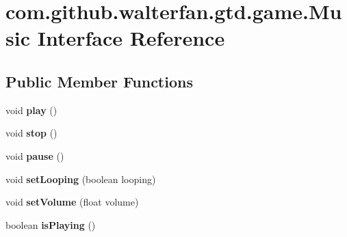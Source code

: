 \hypertarget{interfacecom_1_1github_1_1walterfan_1_1gtd_1_1game_1_1Music}{\section{com.\-github.\-walterfan.\-gtd.\-game.\-Music Interface Reference}
\label{interfacecom_1_1github_1_1walterfan_1_1gtd_1_1game_1_1Music}
}
\subsection*{Public Member Functions}
\begin{DoxyCompactItemize}
\item 
\hypertarget{interfacecom_1_1github_1_1walterfan_1_1gtd_1_1game_1_1Music_a6332f5ac71cb2adf387bc25f4e480fdf}{void {\bfseries play} ()}\label{interfacecom_1_1github_1_1walterfan_1_1gtd_1_1game_1_1Music_a6332f5ac71cb2adf387bc25f4e480fdf}

\item 
\hypertarget{interfacecom_1_1github_1_1walterfan_1_1gtd_1_1game_1_1Music_aebce2670321a2b1a30df5a827c6a170a}{void {\bfseries stop} ()}\label{interfacecom_1_1github_1_1walterfan_1_1gtd_1_1game_1_1Music_aebce2670321a2b1a30df5a827c6a170a}

\item 
\hypertarget{interfacecom_1_1github_1_1walterfan_1_1gtd_1_1game_1_1Music_abb16e4cc97ecf12fea80869cbe3278f9}{void {\bfseries pause} ()}\label{interfacecom_1_1github_1_1walterfan_1_1gtd_1_1game_1_1Music_abb16e4cc97ecf12fea80869cbe3278f9}

\item 
\hypertarget{interfacecom_1_1github_1_1walterfan_1_1gtd_1_1game_1_1Music_a7963d3a9788212b382cc95f1612fc47d}{void {\bfseries set\-Looping} (boolean looping)}\label{interfacecom_1_1github_1_1walterfan_1_1gtd_1_1game_1_1Music_a7963d3a9788212b382cc95f1612fc47d}

\item 
\hypertarget{interfacecom_1_1github_1_1walterfan_1_1gtd_1_1game_1_1Music_a32f8107ca372cc9aa37245b44074a5d5}{void {\bfseries set\-Volume} (float volume)}\label{interfacecom_1_1github_1_1walterfan_1_1gtd_1_1game_1_1Music_a32f8107ca372cc9aa37245b44074a5d5}

\item 
\hypertarget{interfacecom_1_1github_1_1walterfan_1_1gtd_1_1game_1_1Music_a2927021aa715255e3d5c95042c87506e}{boolean {\bfseries is\-Playing} ()}\label{interfacecom_1_1github_1_1walterfan_1_1gtd_1_1game_1_1Music_a2927021aa715255e3d5c95042c87506e}


\end{DoxyCompactItemize}
